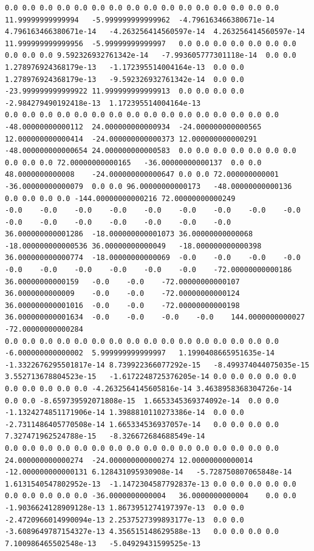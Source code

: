 \documentclass[12pt]{report} %
\begin{document}
\begin{landscape}
\begin{lstlisting}[numbers=none, basicstyle=\ttfamily\tiny, captionpos=b, caption={Matriz de coeficientes $W = G^{-1}$ ($54\times54$) calculada con Julia, sin redondear.}, label=cod:W-julia]
0.0	0.0	0.0	0.0	0.0	0.0	0.0	0.0	0.0	0.0	0.0	0.0	0.0	0.0	0.0	0.0	11.99999999999994	-5.999999999999962	-4.796163466380671e-14	4.796163466380671e-14	-4.263256414560597e-14	4.263256414560597e-14	11.999999999999956	-5.99999999999997	0.0	0.0	0.0	0.0	0.0	0.0	0.0	0.0	0.0	0.0	9.592326932761342e-14	-7.993605777301118e-14	0.0	0.0	1.278976924368179e-13	-1.172395514004164e-13	0.0	0.0	1.278976924368179e-13	-9.592326932761342e-14	0.0	0.0	-23.999999999999922	11.999999999999913	0.0	0.0	0.0	0.0	-2.984279490192418e-13	1.172395514004164e-13
0.0	0.0	0.0	0.0	0.0	0.0	0.0	0.0	0.0	0.0	0.0	0.0	0.0	0.0	0.0	0.0	-48.00000000000112	24.000000000000934	-24.000000000000565	12.000000000000414	-24.000000000000373	12.000000000000291	-48.000000000000654	24.000000000000583	0.0	0.0	0.0	0.0	0.0	0.0	0.0	0.0	0.0	0.0	72.00000000000165	-36.00000000000137	0.0	0.0	48.0000000000008	-24.000000000000647	0.0	0.0	72.000000000001	-36.00000000000079	0.0	0.0	96.00000000000173	-48.00000000000136	0.0	0.0	0.0	0.0	-144.00000000000216	72.00000000000249
-0.0	-0.0	-0.0	-0.0	-0.0	-0.0	-0.0	-0.0	-0.0	-0.0	-0.0	-0.0	-0.0	-0.0	-0.0	-0.0	36.000000000001286	-18.000000000001073	36.00000000000068	-18.000000000000536	36.00000000000049	-18.000000000000398	36.000000000000774	-18.00000000000069	-0.0	-0.0	-0.0	-0.0	-0.0	-0.0	-0.0	-0.0	-0.0	-0.0	-72.00000000000186	36.00000000000159	-0.0	-0.0	-72.00000000000107	36.0000000000009	-0.0	-0.0	-72.00000000000124	36.000000000001016	-0.0	-0.0	-72.00000000000198	36.000000000001634	-0.0	-0.0	-0.0	-0.0	144.0000000000027	-72.00000000000284
0.0	0.0	0.0	0.0	0.0	0.0	0.0	0.0	0.0	0.0	0.0	0.0	0.0	0.0	0.0	0.0	-6.000000000000002	5.999999999999997	1.1990408665951635e-14	-1.3322676295501817e-14	8.739922366077292e-15	-8.499374044075035e-15	3.552713678804523e-15	-1.6172248725376205e-14	0.0	0.0	0.0	0.0	0.0	0.0	0.0	0.0	0.0	0.0	-4.2632564145605816e-14	3.4638958368304726e-14	0.0	0.0	-8.659739592071808e-15	1.6653345369374092e-14	0.0	0.0	-1.1324274851171906e-14	1.3988810110273386e-14	0.0	0.0	-2.7311486405770508e-14	1.665334536937057e-14	0.0	0.0	0.0	0.0	7.327471962524788e-15	-8.326672684688549e-14
0.0	0.0	0.0	0.0	0.0	0.0	0.0	0.0	0.0	0.0	0.0	0.0	0.0	0.0	0.0	0.0	24.000000000000274	-24.000000000000274	12.00000000000014	-12.000000000000131	6.128431095930908e-14	-5.728750807065848e-14	1.6131540547802952e-13	-1.1472304587792837e-13	0.0	0.0	0.0	0.0	0.0	0.0	0.0	0.0	0.0	0.0	-36.0000000000004	36.0000000000004	0.0	0.0	-1.9036624128909128e-13	1.8673951274197397e-13	0.0	0.0	-2.4720966014990094e-13	2.2537527399893177e-13	0.0	0.0	-3.6089649787154327e-13	4.356515148629588e-13	0.0	0.0	0.0	0.0	7.100986465502548e-13	-5.04929431599525e-13

\end{lstlisting}
\end{landscape}
\end{document}
